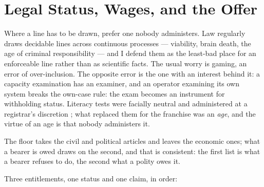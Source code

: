 \chapter{Legal Status, Wages, and the Offer}
\label{sec:31}

Where a line has to be drawn, prefer one nobody administers. Law regularly draws decidable lines across continuous processes — viability, brain death, the age of criminal responsibility — and I defend them as the least-bad place for an enforceable line rather than as scientific facts. The usual worry is gaming, an error of over-inclusion. The opposite error is the one with an interest behind it: a capacity examination has an examiner, and an operator examining its own system breaks the own-case rule: the exam becomes an instrument for withholding status. Literacy tests were facially neutral and administered at a registrar's discretion \autocite{congress1965voting}; what replaced them for the franchise was an \emph{age}, and the virtue of an age is that nobody administers it.

The floor takes the civil and political articles and leaves the economic ones; what a bearer is owed draws on the second, and that is consistent: the first list is what a bearer refuses to do, the second what a polity owes it.


Three entitlements, one status and one claim, in order:

